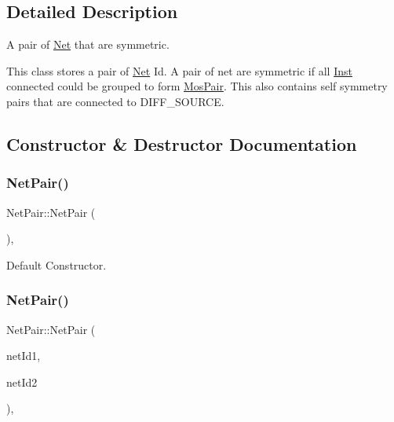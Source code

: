 \subsection{Detailed Description}
A pair of \hyperlink{classNet}{Net} that are symmetric. 

This class stores a pair of \hyperlink{classNet}{Net} Id. A pair of net are symmetric if all \hyperlink{classInst}{Inst} connected could be grouped to form \hyperlink{classMosPair}{Mos\+Pair}. This also contains self symmetry pairs that are connected to D\+I\+F\+F\+\_\+\+S\+O\+U\+R\+CE. 

\subsection{Constructor \& Destructor Documentation}
\mbox{\label{classNetPair_a49a3fe4ad4e8a235a6e63f556546fd4a}} 
\subsubsection{\texorpdfstring{Net\+Pair()}{NetPair()}\hspace{0.1cm}{\footnotesize\ttfamily [1/2]}}
{\footnotesize\ttfamily Net\+Pair\+::\+Net\+Pair (\begin{DoxyParamCaption}{ }\end{DoxyParamCaption})\hspace{0.3cm}{\ttfamily [explicit]}, {\ttfamily [default]}}



Default Constructor. 

\mbox{\label{classNetPair_a202b7e705b1958c76c7608a636968e70}} 
\subsubsection{\texorpdfstring{Net\+Pair()}{NetPair()}\hspace{0.1cm}{\footnotesize\ttfamily [2/2]}}
{\footnotesize\ttfamily Net\+Pair\+::\+Net\+Pair (\begin{DoxyParamCaption}\item[{\hyperlink{type_8h_a581e8093e28e7362f2b6937296190676}{Index\+Type}}]{net\+Id1,  }\item[{\hyperlink{type_8h_a581e8093e28e7362f2b6937296190676}{Index\+Type}}]{net\+Id2 }\end{DoxyParamCaption})\hspace{0.3cm}{\ttfamily [inline]}, {\ttfamily [explicit]}}




